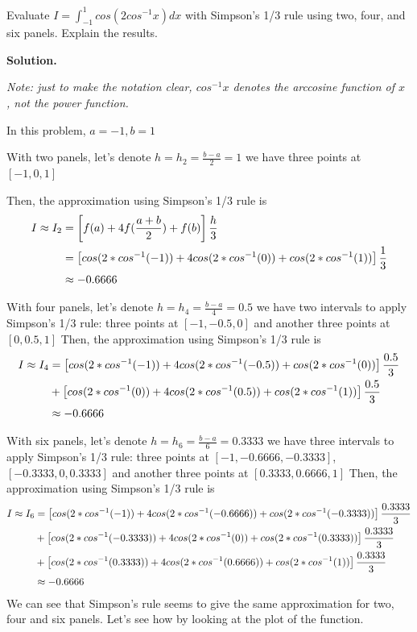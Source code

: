 \begin{exercise}{2} %
Evaluate $I=\int_{-1}^1 cos(2cos^{-1}x)dx$ with Simpson’s 1/3 rule using two, four, and six
panels. Explain the results.

\textbf{Solution.}

\textit{Note: just to make the notation clear, $cos^{-1}x$ denotes the arccosine function of \(x\) , not the power function.}

In this problem, \(a=-1, b=1\)

With two panels, let's denote $h= h_2=\frac{b-a}{2}=1$  we have three points at \([-1,0,1]\)

Then, the approximation using Simpson's 1/3 rule is
\begin{align}
I \approx I_2 &= \left[f(a) + 4f(\frac{a+b}{2}) + f(b)\right]\frac{h}{3} \notag \\
&=\left[cos(2*cos^{-1}(-1))+4cos(2*cos^{-1}(0)) + cos(2*cos^{-1}(1))\right]\frac{1}{3} \notag \\
&\approx -0.6666 \notag
\end{align}

With four panels, let's denote \(h= h_4=\frac{b-a}{4}=0.5\) we have two intervals to apply Simpson's 1/3 rule: three points at \([-1,-0.5,0]\) and another three points at \([0,0.5,1]\)
Then, the approximation using Simpson's 1/3 rule is
\begin{align}
I \approx I_4 &= \left[cos(2*cos^{-1}(-1))+4cos(2*cos^{-1}(-0.5)) + cos(2*cos^{-1}(0))\right]\frac{0.5}{3} \notag \\
&+ \left[cos(2*cos^{-1}(0))+4cos(2*cos^{-1}(0.5)) + cos(2*cos^{-1}(1))\right]\frac{0.5}{3} \notag \\
&\approx -0.6666 \notag
\end{align}

With six panels, let's denote \(h= h_6=\frac{b-a}{6}=0.3333\) we have three intervals to apply Simpson's 1/3 rule: three points at \([-1,-0.6666,-0.3333]\), \([-0.3333,0,0.3333]\) and another three points at \([0.3333,0.6666,1]\)
Then, the approximation using Simpson's 1/3 rule is
\begin{align}
I \approx I_6 &= \left[cos(2*cos^{-1}(-1))+4cos(2*cos^{-1}(-0.6666)) + cos(2*cos^{-1}(-0.3333))\right]\frac{0.3333}{3} \notag \\
&+ \left[cos(2*cos^{-1}(-0.3333))+4cos(2*cos^{-1}(0)) + cos(2*cos^{-1}(0.3333))\right]\frac{0.3333}{3} \notag \\
&+ \left[cos(2*cos^{-1}(0.3333))+4cos(2*cos^{-1}(0.6666)) + cos(2*cos^{-1}(1))\right]\frac{0.3333}{3} \notag \\
&\approx -0.6666 \notag
\end{align}
We can see that Simpson's rule seems to give the same approximation for two, four and six panels. 
Let's see how by looking at the plot of the function.


\end{exercise}
